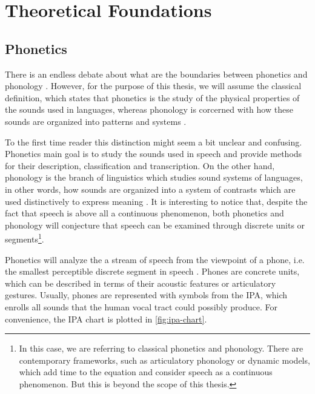\chapter{Theoretical Foundations}\label{ch:foundations}

\section{Phonetics}\label{sec:phonetics}

There is an endless debate about what are the boundaries between phonetics and phonology \cite{Steriade2000}. However, for the purpose of this thesis, we will assume the classical definition, which states that phonetics is the study of the physical properties of the sounds used in languages, whereas phonology is corcerned with how these sounds are organized into patterns and systems \cite{Davenport2010}.

To the first time reader this distinction might seem a bit unclear and confusing. Phonetics main goal is to study the sounds used in speech and provide methods for their description, classification and transcription. On the other hand, phonology is the branch of linguistics which studies sound systems of languages, in other words, how sounds are organized into a system of contrasts which are used distinctively to express meaning \cite{Crystal2011}. It is interesting to notice that, despite the fact that speech is above all a continuous phenomenon, both phonetics and phonology will conjecture that speech can be examined through discrete units or segments\footnote{In this case, we are referring to classical phonetics and phonology. There are contemporary frameworks, such as articulatory phonology or dynamic models, which add time to the equation and consider speech as a continuous phenomenon. But this is beyond the scope of this thesis.}.

Phonetics will analyze the a stream of speech from the viewpoint of a phone, i.e. the smallest perceptible discrete segment in speech \cite{Crystal2011}. Phones are concrete units, which can be described in terms of their acoustic features or articulatory gestures. Usually, phones are represented with symbols from the \ac{IPA}, which enrolls all sounds that the human vocal tract could possibly produce. For convenience, the \ac{IPA} chart is plotted in \autoref{fig:ipa-chart}.


